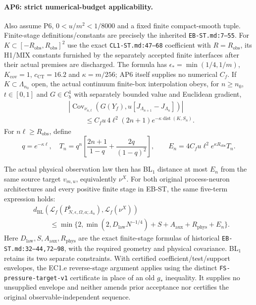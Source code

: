 \paragraph{AP6: strict numerical-budget applicability.}
Also assume P6, $0<u/m^2<1/8000$ and a fixed finite compact-smooth tuple.
Finite-stage definitions/constants are precisely the inherited
\texttt{EB-ST.md:7--55}. For $K\subset[-R_{\mathrm{obs}},R_{\mathrm{obs}}]^2$
use the exact \texttt{CL1-ST.md:47--68} coefficient with
$R=R_{\mathrm{obs}}$, its H1/MIX constants furnished by the separately
accepted finite interfaces after their actual premises are discharged.
The formula has $\epsilon_*=\min(1/4,1/m)$, $K_{\mathrm{cov}}=1$,
$c_{\mathrm{CT}}=16.2$ and $\kappa=m/256$; AP6 itself supplies no
numerical $C_f$. If $K\subset\Lambda_{n_0}$ open, the actual continuum
finite-box interpolation obeys, for $n\ge n_0$, $t\in[0,1]$ and
$G\in C_b^1$ with separately bounded value and Euclidean gradient,
\begin{align*}
 &\left|\operatorname{Cov}_{\nu_{n,t}}
 \left(G(Y_f),u[J_{\Lambda_{n+1}}-J_{\Lambda_n}]\right)\right|\\
 &\hspace{1cm}\le C_f u\,4\ell^2(2n+1)e^{-\kappa\operatorname{dist}(K,S_n)}.
\end{align*}
For $n\ell\ge R_{\mathrm{obs}}$, define
\[
 q=e^{-\kappa\ell},\quad
 T_n=q^n\left[\frac{2n+1}{1-q}+\frac{2q}{(1-q)^2}\right],\qquad
 E_n=4C_f u\ell^2e^{\kappa R_{\mathrm{obs}}}T_n.
\]

The actual physical observation law then has BL$_1$ distance at most
$E_n$ from the same source target $v_{m,u}$, equivalently $\nu^X$.
For both original process-neuron architectures and every positive finite
stage in EB-ST, the same five-term expression holds:
\begin{align*}
 &d_{\mathrm{BL}}\left(\mathcal L_f(P^b_{N,\epsilon,\Omega,a;\Lambda_n}),
                                 \mathcal L_f(\nu^X)\right)\\
 &\hspace{1cm}\le\min\{2,\min(2,D_{\mathrm{law}}N^{-1/4})
              +S+A_{\mathrm{aux}}+R_{\mathrm{phys}}+E_n\}.
\end{align*}
Here $D_{\mathrm{law}},S,A_{\mathrm{aux}},R_{\mathrm{phys}}$ are the exact
finite-stage formulas of historical \texttt{EB-ST.md:32--44,72--98}, with
the required geometry and physical covariance. BL$_1$ retains its two
separate constraints. With certified coefficient/test/support envelopes,
the EC1.e reverse-stage argument applies using the distinct
\texttt{FS-pressure-target-v1} certificate in place of an old $g_*$
inequality. It supplies no unsupplied envelope and neither amends prior
acceptance nor certifies the original observable-independent sequence.

